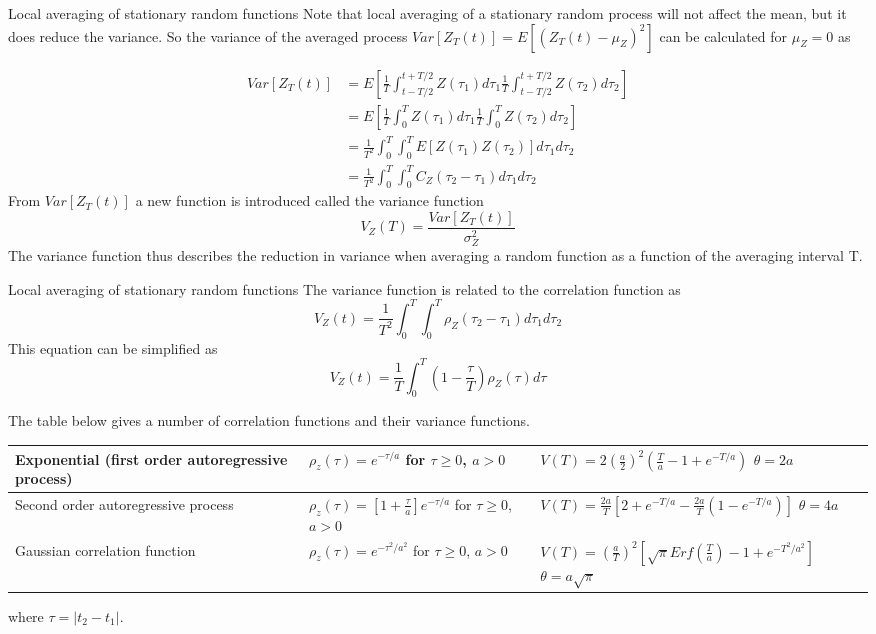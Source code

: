 \documentclass[8pt]{beamer}
\renewcommand{\emph}[1]{\textcolor{myorange}{#1}}
\begin{document}
\begin{frame}{Local averaging of stationary random functions}
    Note that \emph{local averaging} of a \emph{stationary random process} will not affect the \emph{mean}, but it does reduce the \emph{variance}. So the \emph{variance} of the \emph{averaged process}  $Var[Z_T (t)] = E\left[(Z_T (t) - \mu_Z)^2\right]$ can be calculated for $\mu_Z  = 0$ as

\[
    \begin{aligned}
        Var[ Z_T (t) ] &= E\left[ \frac{1}{T}\int_{t-T/2}^{t+T/2} Z(\tau_1) d\tau_1 \frac{1}{T}\int_{t-T/2}^{t+T/2} Z(\tau_2) d\tau_2 \right] \\
                      &= E\left[ \frac{1}{T}\int_{0}^{T} Z(\tau_1) d\tau_1 \frac{1}{T}\int_{0}^{T} Z(\tau_2) d\tau_2 \right] \\
                      &= \frac{1}{T^2} \int_{0}^{T} \int_{0}^{T} E\left[ Z(\tau_1) Z(\tau_2) \right] d\tau_1 d\tau_2 \\
                      &= \frac{1}{T^2} \int_{0}^{T} \int_{0}^{T} C_Z (\tau_2 - \tau_1) d\tau_1 d\tau_2 
    \end{aligned}
\]
From $Var[ Z_T (t) ]$ a new function is introduced called the \alert{variance function}
\[
    V_Z (T) = \frac{Var[Z_T (t)]}{\sigma_Z^2}
\]
The \emph{variance function} thus describes the reduction in variance when averaging a random function as a function of the \emph{averaging interval T}.
\end{frame}

\begin{frame}{Local averaging of stationary random functions}
    The \emph{variance function} is related to the \emph{correlation function} as
    \[
        V_Z (t) = \frac{1}{T^2} \int_{0}^{T} \int_{0}^{T} \rho_Z (\tau_2 - \tau_1) d\tau_1 d\tau_2 
    \]
This equation can be simplified as
\[
    V_Z (t) = \frac{1}{T} \int_{0}^{T} \left( 1- \frac{\tau}{T} \right) \rho_Z (\tau) d\tau
\]

The table below gives a number of \emph{correlation functions} and their \emph{variance functions}. 

    \begin{center}
        \begin{tabular}{|p{2cm}|p{3cm}|p{5.2cm}|}
  Exponential (first order autoregressive process) & $\rho_z (\tau) =  e^{-\tau/a}$ for $\tau \geq 0$, $a>0$ & $V(T) = 2 \left(\frac{a}{2}\right)^2 \left(\frac{T}{a} -1 + e^{-T/a} \right)$ $\theta = 2a$\\ \hline
  Second order autoregressive process & $\rho_z (\tau) = \left[ 1 + \frac{\tau}{a}\right] e^{-\tau/a}$  for $\tau \geq 0$, $a>0$ & $V(T) = \frac{2a}{T} \left[2 + e^{-T/a} - \frac{2a}{T} \left(1- e^{-T/a} \right) \right]$ $\theta = 4a$ \\ \hline
  Gaussian correlation function & $\rho_z (\tau) =  e^{-\tau^2 /a^2 }$  for $\tau \geq 0$, $a>0$ & $V(T) = \left(\frac{a}{T}\right)^2 \left[\sqrt{\pi} Erf\left(\frac{T}{a}\right) -1  + e^{-T^2/a^2}\right]$ $\theta = a\sqrt{\pi}$  
  \end{tabular}
    \end{center}
    where $\tau = |t_2 - t_1|$. 

\end{frame}
\end{document}
